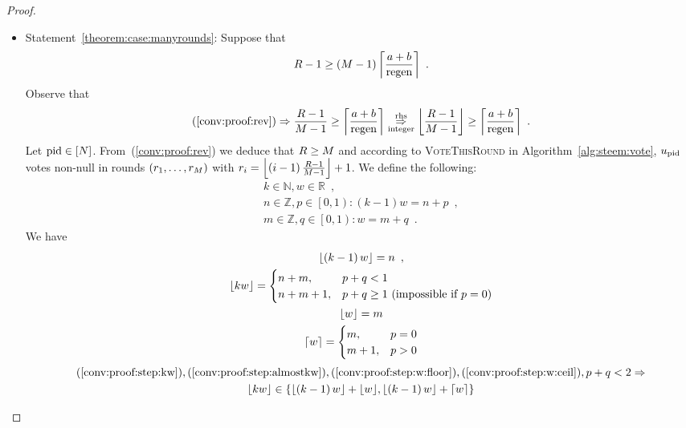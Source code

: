 \begin{proof}
\begin{itemize}
    \item Statement~\ref{theorem:case:manyrounds}: Suppose that
    \begin{equation}
      \label{conv:proof:rev}
      \rounds - 1 \geq \left(\postlen - 1\right)\ceil*{\frac{a+b}{\regen}}
      \enspace.
    \end{equation}
    Observe that
    \begin{equation}
      \label{conv:proof:integer}
      \left(\ref{conv:proof:rev}\right) \Rightarrow \frac{\rounds - 1}{\postlen
      - 1} \geq \ceil*{\frac{a+b}{\regen}}
      \underset{\text{integer}}{\overset{\text{rhs}}{\Rightarrow}}
      \floor*{\frac{\rounds - 1}{\postlen - 1}} \geq \ceil*{\frac{a+b}{\regen}}
      \enspace.
    \end{equation}
    Let $\pid \in \left[\playerlen\right]$. From~(\ref{conv:proof:rev}) we
    deduce that $\rounds \geq \postlen$ and according to \textsc{VoteThisRound}
    in Algorithm~\ref{alg:steem:vote}, $u_{\pid}$ votes non-null in rounds
    $\left(\round_1, \dots, \round_\postlen\right)$ with $r_i = \floor*{\left(i
    - 1\right)\frac{\rounds - 1}{\postlen - 1}} + 1$. We define the following:
    \begin{gather*}
      k \in \mathbb{N}, w \in \mathbb{R} \enspace, \\
      n \in \mathbb{Z}, p \in \left[0, 1\right) : \left(k - 1\right)w = n + p
      \enspace, \\
      m \in \mathbb{Z}, q \in \left[0, 1\right) : w = m + q \enspace.
    \end{gather*}
    We have
    \begin{gather}
      \label{conv:proof:step:kw}
      \floor*{\left(k - 1\right)w} = n \enspace, \\
      \label{conv:proof:step:almostkw}
      \floor*{kw} =
      \begin{cases}
        n + m, & p + q < 1 \\
        n + m + 1, & p + q \geq 1 \text{ (impossible if } p = 0\text{)}
      \end{cases} \\
      \label{conv:proof:step:w:floor}
      \floor*{w} = m \\
      \label{conv:proof:step:w:ceil}
      \ceil*{w} =
      \begin{cases}
        m, & p = 0 \\
        m + 1, & p > 0
      \end{cases}
    \end{gather}
    \begin{equation}
      \label{conv:proof:step:floors}
      \begin{gathered}
        (\ref{conv:proof:step:kw}), (\ref{conv:proof:step:almostkw}),
        (\ref{conv:proof:step:w:floor}), (\ref{conv:proof:step:w:ceil}), p + q <
        2 \Rightarrow \\
        \floor*{kw} \in \left\{\floor*{\left(k - 1\right)w} + \floor*{w},
        \floor*{\left(k - 1\right)w} + \ceil*{w}\right\}
      \end{gathered}
    \end{equation}


\end{itemize}
\end{proof}
